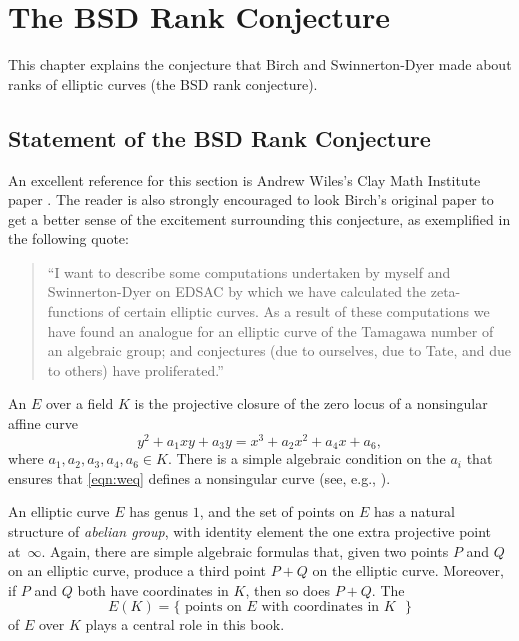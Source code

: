\chapter{The BSD Rank Conjecture}\label{ch:rank}
This chapter explains the conjecture that Birch and Swinnerton-Dyer
made about ranks of elliptic curves (the BSD rank conjecture).

\section{Statement of the BSD Rank Conjecture}\label{sec:bsdrank}

An excellent reference for this section is Andrew Wiles's 
Clay Math Institute paper \cite{wiles:cmi}.   The reader
is also strongly encouraged to look Birch's original
paper \cite{birch:bsd} to get a better sense of the excitement
surrounding this conjecture, as exemplified in the following
quote:
\begin{quote}
  ``I want to describe some computations undertaken by myself and
  Swinnerton-Dyer on EDSAC by which we have calculated the
  zeta-functions of certain elliptic curves. As a result of these
  computations we have found an analogue for an elliptic curve of the
  Tamagawa number of an algebraic group; and conjectures (due to
  ourselves, due to Tate, and due to others) have proliferated.''
\end{quote}

An  $E$ over a field $K$
is the projective closure
of the zero locus of a nonsingular affine curve 
\begin{equation}\label{eqn:weq}
   y^2 + a_1 xy + a_3 y = x^3 + a_2 x^2 + a_4 x + a_6,
\end{equation}
where $a_1,a_2,a_3,a_4,a_6\in K$.
There is a simple algebraic condition on the $a_i$ that 
ensures that \eqref{eqn:weq} defines a nonsingular curve
(see, e.g., \cite{silverman:aec}).

An elliptic curve $E$ has genus $1$, and the set of points on $E$ has
a natural structure of {\em abelian group}, with identity element the one
extra projective point at~$\infty$.  Again, there are simple algebraic
formulas that, given two points $P$ and $Q$ on an elliptic curve,
produce a third point  $P+Q$  on the elliptic curve.  Moreover,
if $P$ and $Q$ both have coordinates in $K$, then so does $P+Q$.
The 
$$
  E(K) = \{\text{ points on $E$ with coordinates in $K$ }\}
$$
of $E$ over $K$ plays a central role in this book. 

